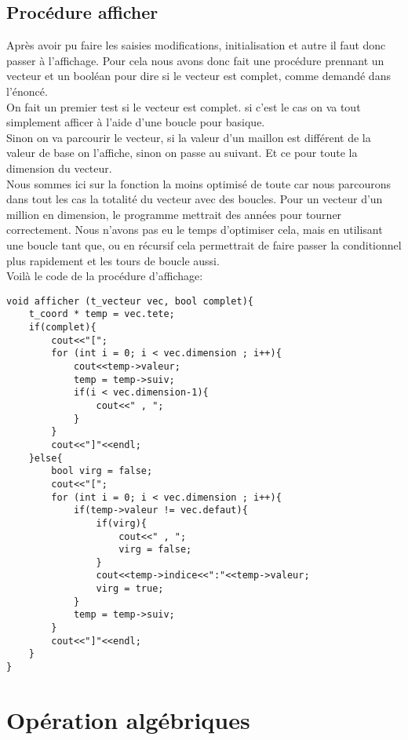 \documentclass[a4paper,11pt,final]{article}
\begin{document}
\subsection{Procédure afficher}
Après avoir pu faire les saisies modifications, initialisation et autre il faut donc passer à l'affichage. Pour cela nous avons donc fait une procédure prennant un vecteur et un booléan pour dire si le vecteur est complet, comme demandé dans l'énoncé.\\
On fait un premier test si le vecteur est complet. si c'est le cas on va tout simplement afficer à l'aide d'une boucle pour basique.\\
Sinon on va parcourir le vecteur, si la valeur d'un maillon est différent de la valeur de base on l'affiche, sinon on passe au suivant. Et ce pour toute la dimension du vecteur. \\
Nous sommes ici sur la fonction la moins optimisé de toute car nous parcourons dans tout les cas la totalité du vecteur avec des boucles. Pour un vecteur d'un million en dimension, le programme mettrait des années pour tourner correctement. Nous n'avons pas eu le temps d'optimiser cela, mais en utilisant une boucle tant que, ou en récursif cela permettrait de faire passer la conditionnel plus rapidement et les tours de boucle aussi.\\
Voilà le code de la procédure d'affichage:
\begin{verbatim}
void afficher (t_vecteur vec, bool complet){
    t_coord * temp = vec.tete;
    if(complet){
        cout<<"[";
        for (int i = 0; i < vec.dimension ; i++){
            cout<<temp->valeur;
            temp = temp->suiv;
            if(i < vec.dimension-1){
                cout<<" , ";
            }
        }
        cout<<"]"<<endl;
    }else{
        bool virg = false;
        cout<<"[";
        for (int i = 0; i < vec.dimension ; i++){
            if(temp->valeur != vec.defaut){
                if(virg){
                    cout<<" , ";
                    virg = false;
                }
                cout<<temp->indice<<":"<<temp->valeur;
                virg = true;
            }
            temp = temp->suiv;
        }
        cout<<"]"<<endl;
    }
}
\end{verbatim}

\section{Opération algébriques}
\end{document}
